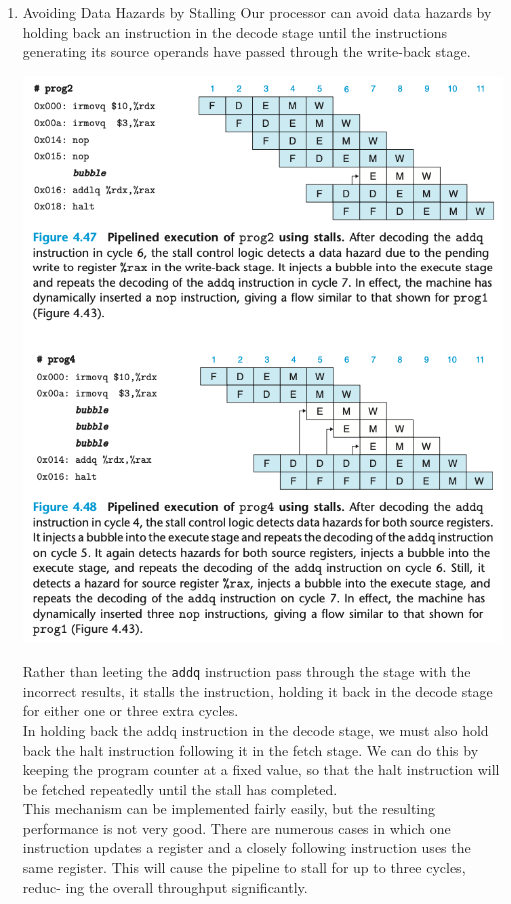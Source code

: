 \documentclass[11pt]{article}
\begin{document}
\begin{enumerate}
\item Avoiding Data Hazards by Stalling
\label{sec:org7ec0aa6}
Our processor can avoid data hazards by holding back an instruction in the decode stage until the instructions generating its source operands have passed through the write-back stage.\\

\begin{center}
\includegraphics[width=.9\linewidth]{pics/figure4.47-4.48.png}
\end{center}

Rather than leeting the \texttt{addq} instruction pass through the stage with the incorrect results, it stalls the instruction, holding it back in the decode stage for either one or three extra cycles.\\

In holding back the addq instruction in the decode stage, we must also hold back the halt instruction following it in the fetch stage. We can do this by keeping the program counter at a fixed value, so that the halt instruction will be fetched repeatedly until the stall has completed.\\

This mechanism can be implemented fairly easily, but the resulting performance is not very good. There are numerous cases in which one instruction updates a register and a closely following instruction uses the same register. This will cause the pipeline to stall for up to three cycles, reduc- ing the overall throughput significantly.\\



\end{enumerate}
\end{document}
